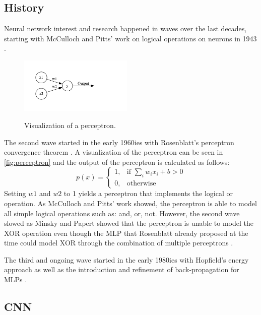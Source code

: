 \documentclass[10pt]{book}
\newcommand{\figureref}[1]{\autoref{#1}}
\begin{document}
\subsection{History}

Neural network interest and research happened in waves over the last decades, starting with McCulloch and Pitts' work on logical operations on neurons in 1943 \cite{mcculloch1943logical,485891}. 

\begin{figure}
  \caption{Visualization of a perceptron.}
  \includegraphics[width=0.48\textwidth]{graph/rosenblatt}
  \label{fig:perceptron}
\end{figure}

The second wave started in the early 1960ies with Rosenblatt's perceptron convergence theorem \cite{rosenblatt1962principles}. A visualization of the perceptron can be seen in \figureref{fig:perceptron} and the output of the perceptron is calculated as follows:
\[
    p(x)= 
\begin{cases}
    1, & \text{if } \sum_i w_ix_i + b > 0\\
    0, & \text{otherwise}
\end{cases}
\]
Setting $w1$ and $w2$ to 1 yields a perceptron that implements the logical or operation. As McCulloch and Pitts' work showed, the perceptron is able to model all simple logical operations such as: and, or, not. However, the second wave slowed as Minsky and Papert showed that the perceptron is unable to model the XOR operation \cite{minsky1969perceptron} even though the \ac{MLP} that Rosenblatt already proposed at the time could model XOR through the combination of multiple perceptrons \cite{schmidhuber2022annotated}.

The third and ongoing wave started in the early 1980ies with Hopfield's energy approach \cite{hopfield1982neural} as well as the introduction and refinement of back-propagation for \acp{MLP} \cite{werbos1974beyond,rumelhart1986parallel}.

\subsection{CNN}
\end{document}
